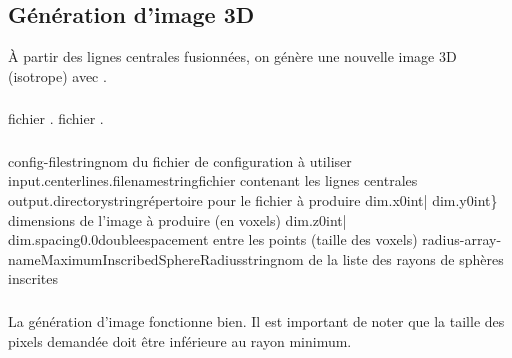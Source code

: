 	\subsection{Génération d'image 3D}

À partir des lignes centrales fusionnées, on génère une nouvelle image 3D (isotrope) avec .

	\subsubsection{\ioT}

\iolist
{fichier \vtk.}
{fichier \mha.}


	\subsubsection{\argsT}

\args
{config-file}{}{string}{nom du fichier de configuration à utiliser}
{input.centerlines.filename}{}{string}{fichier \vtk contenant les lignes centrales}
{output.directory}{}{string}{répertoire pour le fichier \mha à produire}
{dim.x}{0}{int}{|}
{dim.y}{0}{int}{\} dimensions de l'image à produire (en voxels)}
{dim.z}{0}{int}{|}
{dim.spacing}{0.0}{double}{espacement entre les points (taille des voxels)}
{radius-array-name}{MaximumInscribedSphereRadius}{string}{nom de la liste des rayons de sphères inscrites}
\stoparg


	\subsubsection{\etatg}

La génération d'image fonctionne bien. Il est important de noter que la taille des pixels demandée doit être inférieure au rayon minimum.

